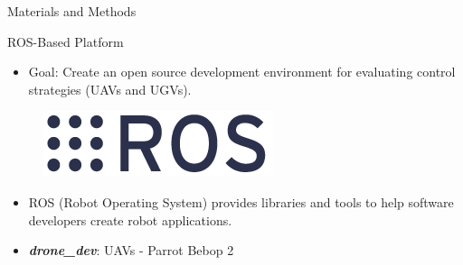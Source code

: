 \begin{frame}{Materials and Methods}
\begin{block}{ROS-Based Platform}
\begin{itemize}
	\item Goal: Create an open source development environment for evaluating control strategies (UAVs and UGVs).
\end{itemize}

\begin{figure}[!h]
	\centering
	\includegraphics[scale=0.5]{img/ros.png}
\end{figure}
\begin{itemize}
	\item ROS (Robot Operating System) provides libraries and tools to help software developers create robot applications.
	\item \textit{\textbf{drone\_dev}}: UAVs - Parrot Bebop 2
\end{itemize}
\end{block}

\end{frame}



